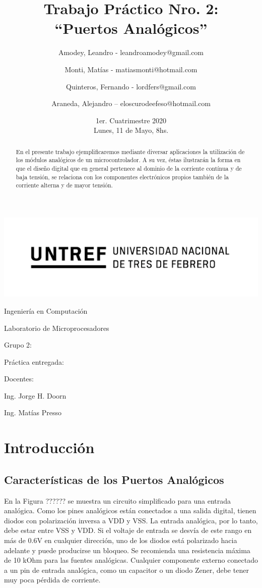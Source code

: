 \documentclass[a4paper]{article}
\title{Trabajo Práctico Nro. 2:\\“Puertos Analógicos”}
\author{Amodey, Leandro - leandroamodey@gmail.com
\and Monti, Matías - matiasmonti@hotmail.com
\and Quinteros, Fernando - lordfers@gmail.com
\and Araneda, Alejandro – eloscurodeefeso@hotmail.com}
\date{1er. Cuatrimestre 2020\\Lunes, 11 de Mayo, 8hs.}
\def\teacher{Ing. Jorge H. Doorn
\and Ing. Matías Presso}
\begin{document}

\begin{titlepage}\renewcommand\and\par\centering\makeatletter
    \includegraphics{logo.png}\par
    {\Large Ingeniería en Computación \par}\vspace{0.5cm}
    {\LARGE Laboratorio de Microprocesadores \par}\vfill
    {\huge \@title \par}\vfill
    Grupo 2:\par
    \@author\vfill
    Práctica entregada:\par
    \@date\vfill
    Docentes:\par
    \teacher\vspace{1cm}\makeatother
\end{titlepage}

\begin{abstract}

    En el presente trabajo ejemplificaremos mediante diversar 
    aplicaciones la utilización de los módulos analógicos de un 
    microcontrolador. A su vez, éstas ilustrarán la forma en que el 
    diseño digital que en general pertenece al dominio de la 
    corriente contínua y de baja tensión, se relaciona con los 
    componentes electrónicos propios también de la corriente alterna 
    y de mayor tensión.

\end{abstract}

\section{Introducción}

\subsection*{Características de los Puertos Analógicos}

En la Figura ?????? se muestra un circuito simplificado para una
entrada analógica. Como los pines analógicos están conectados
a una salida digital, tienen diodos con polarización inversa a VDD y VSS.
La entrada analógica, por lo tanto, debe estar entre VSS y VDD.
Si el voltaje de entrada se desvía de este rango en más de 0.6V
en cualquier dirección, uno de los diodos está polarizado hacia adelante
y puede producirse un bloqueo.
Se recomienda una resistencia máxima de 10 kOhm para las fuentes analógicas.
Cualquier componente externo conectado a un pin de entrada analógica,
como un capacitor o un diodo Zener, debe tener muy poca pérdida de corriente.
\end{document}
